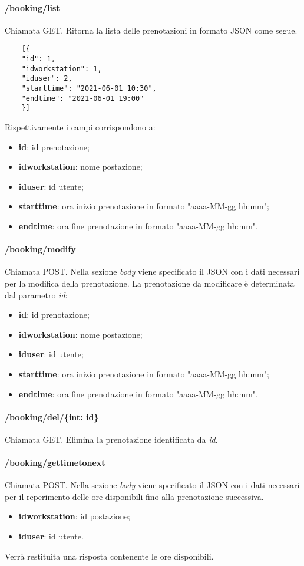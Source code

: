 \paragraph{/booking/list}
Chiamata GET. Ritorna la lista delle prenotazioni in formato JSON come segue.	\\
\begin{center}
	\begin{lstlisting}
	[{
	"id": 1,
	"idworkstation": 1,
	"iduser": 2,
	"starttime": "2021-06-01 10:30",
	"endtime": "2021-06-01 19:00"
	}]
	\end{lstlisting}
\end{center}
Rispettivamente i campi corrispondono a:
\begin{itemize}
	\item \textbf{id}: id prenotazione;
	\item \textbf{idworkstation}: nome postazione;
	\item \textbf{iduser}: id utente;
	\item \textbf{starttime}: ora inizio prenotazione in formato "aaaa-MM-gg hh:mm";
	\item \textbf{endtime}: ora fine prenotazione in formato "aaaa-MM-gg hh:mm".	
\end{itemize}
\paragraph{/booking/modify}
Chiamata POST. Nella sezione \textit{body} viene specificato il JSON con i dati necessari per la modifica della prenotazione. La prenotazione da modificare è determinata dal parametro \textit{id}:
\begin{itemize}
	\item \textbf{id}: id prenotazione;
	\item \textbf{idworkstation}: nome postazione;
	\item \textbf{iduser}: id utente;
	\item \textbf{starttime}: ora inizio prenotazione in formato "aaaa-MM-gg hh:mm";
	\item \textbf{endtime}: ora fine prenotazione in formato "aaaa-MM-gg hh:mm".	
\end{itemize}
\paragraph{/booking/del/\{int: id\}}
Chiamata GET. Elimina la prenotazione identificata da \textit{id}.
\paragraph{/booking/gettimetonext}
Chiamata POST. Nella sezione \textit{body} viene specificato il JSON con i dati necessari per il reperimento delle ore disponibili fino alla prenotazione successiva.
\begin{itemize}
	\item \textbf{idworkstation}: id postazione;
	\item \textbf{iduser}: id utente.
\end{itemize}
Verrà restituita una risposta contenente le ore disponibili.
